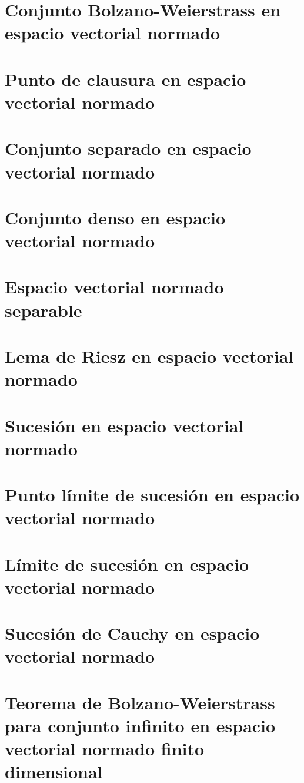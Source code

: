 \section{Conjunto Bolzano-Weierstrass en espacio vectorial normado}

\section{Punto de clausura en espacio vectorial normado}

\section{Conjunto separado en espacio vectorial normado}

\section{Conjunto denso en espacio vectorial normado}

\section{Espacio vectorial normado separable}

\section{Lema de Riesz en espacio vectorial normado}

\section{Sucesión en espacio vectorial normado}

\section{Punto límite de sucesión en espacio vectorial normado}

\section{Límite de sucesión en espacio vectorial normado}

\section{Sucesión de Cauchy en espacio vectorial normado}

\section{Teorema de Bolzano-Weierstrass para conjunto infinito en espacio vectorial normado finito dimensional}

